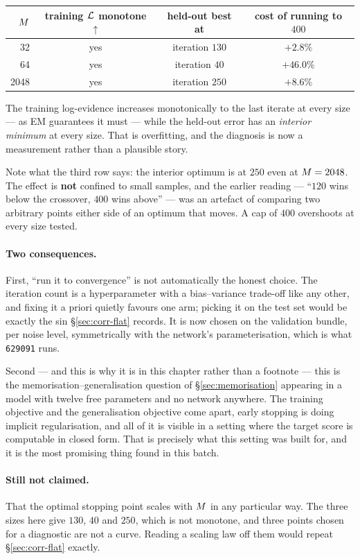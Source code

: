 \begin{pitfall}
\begin{center}\small
\begin{tabular}{@{}rccc@{}}
\toprule
$M$ & training $\mathcal{L}$ monotone $\uparrow$ & held-out best at & cost of running to $400$ \\
\midrule
32   & yes & iteration $130$ & $+2.8\%$ \\
64   & yes & iteration $40$  & $+46.0\%$ \\
2048 & yes & iteration $250$ & $+8.6\%$ \\
\bottomrule
\end{tabular}
\end{center}

\noindent
The training log-evidence increases monotonically to the last iterate at every size --- as EM
guarantees it must --- while the held-out error has an \emph{interior minimum} at every size. That
is overfitting, and the diagnosis is now a measurement rather than a plausible story.

Note what the third row says: the interior optimum is at $250$ even at $M=2048$. The effect is
\textbf{not} confined to small samples, and the earlier reading --- ``$120$ wins below the
crossover, $400$ wins above'' --- was an artefact of comparing two arbitrary points either side of
an optimum that moves. A cap of $400$ overshoots at every size tested.

\paragraph{Two consequences.} First, ``run it to convergence'' is not automatically the honest
choice. The iteration count is a hyperparameter with a bias--variance trade-off like any other, and
fixing it a priori quietly favours one arm; picking it on the test set would be exactly the sin
\S\ref{sec:corr-flat} records. It is now chosen on the validation bundle, per noise level,
symmetrically with the network's parameterisation, which is what \texttt{629091} runs.

Second --- and this is why it is in this chapter rather than a footnote --- this is the
memorisation--generalisation question of \S\ref{sec:memorisation} appearing in a model with twelve
free parameters and no network anywhere. The training objective and the generalisation objective
come apart, early stopping is doing implicit regularisation, and all of it is visible in a setting
where the target score is computable in closed form. That is precisely what this setting was built
for, and it is the most promising thing found in this batch.

\paragraph{Still not claimed.} That the optimal stopping point scales with $M$ in any
particular way. The three sizes here give $130$, $40$ and $250$, which is not monotone, and three
points chosen for a diagnostic are not a curve. Reading a scaling law off them would repeat
\S\ref{sec:corr-flat} exactly.
\end{pitfall}

